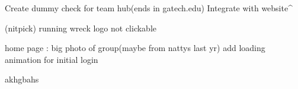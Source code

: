 Create dummy check for team hub(ends in gatech.edu)
Integrate with website^

(nitpick) running wreck logo not clickable

home page :
    big photo of group(maybe from nattys last yr)
    add loading animation for initial login

akhgbahs


